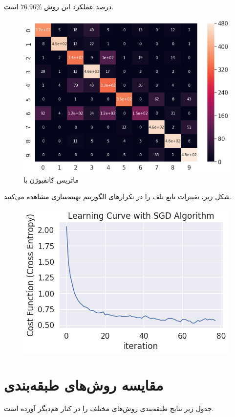 \documentclass[a4paper]{article}
\begin{document}
\begin{large}
  درصد عملکرد این روش 
$76.96 \%$
است.
\begin{figure}[h!]
	\centering
	\includegraphics[scale=0.6]{sgd.png}
	\caption{ماتریس کانفیوژن 
		با 
	}
\end{figure}
شکل زیر، تغییرات تابع تلف را در تکرارهای الگوریتم بهینه‌سازی مشاهده می‌کنید.
\begin{figure}[h!]
	\centering
	\includegraphics[scale=0.6]{sgd2.png}
	\caption{
	}
\end{figure}
\newpage


\section{مقایسه روش‌های طبقه‌بندی}
جدول زیر نتایج طبقه‌بندی روش‌های مختلف را در کنار هم‌دیگر آورده است.
\begin{center}
\begin{table}[h!]
	\centering
	\begin{latin}
	\begin{tabular}{|c|c|c|}
		

\end{tabular}
\end{latin}
\end{table}
\end{center}
\end{large}
\end{document}

